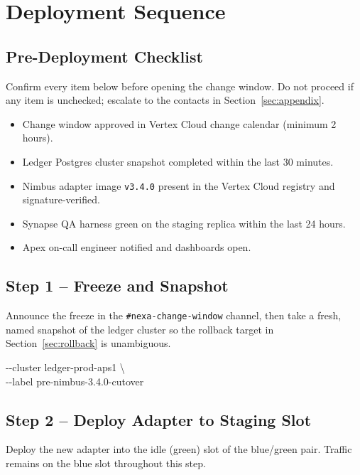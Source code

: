 \section{Deployment Sequence}
\label{sec:integration-sequence}

\subsection{Pre-Deployment Checklist}
Confirm every item below before opening the change window. Do not proceed if any item is
unchecked; escalate to the contacts in Section~\ref{sec:appendix}.

\begin{itemize}
  \item[\statusok] Change window approved in Vertex Cloud change calendar (minimum 2 hours).
  \item[\statusok] Ledger Postgres cluster snapshot completed within the last 30 minutes.
  \item[\statusok] Nimbus adapter image \texttt{v3.4.0} present in the Vertex Cloud registry
    and signature-verified.
  \item[\statusok] Synapse QA harness green on the staging replica within the last 24 hours.
  \item[\statusok] Apex on-call engineer notified and dashboards open.
\end{itemize}

\subsection{Step 1 -- Freeze and Snapshot}
Announce the freeze in the \texttt{\#nexa-change-window} channel, then take a fresh, named
snapshot of the ledger cluster so the rollback target in Section~\ref{sec:rollback} is
unambiguous.

\begin{cmdbox}
\hspace*{1.4em}-{}-cluster ledger-prod-aps1 \textbackslash\\
\hspace*{1.4em}-{}-label pre-nimbus-3.4.0-cutover
\end{cmdbox}

\subsection{Step 2 -- Deploy Adapter to Staging Slot}
Deploy the new adapter into the idle (green) slot of the blue/green pair. Traffic remains on
the blue slot throughout this step.

